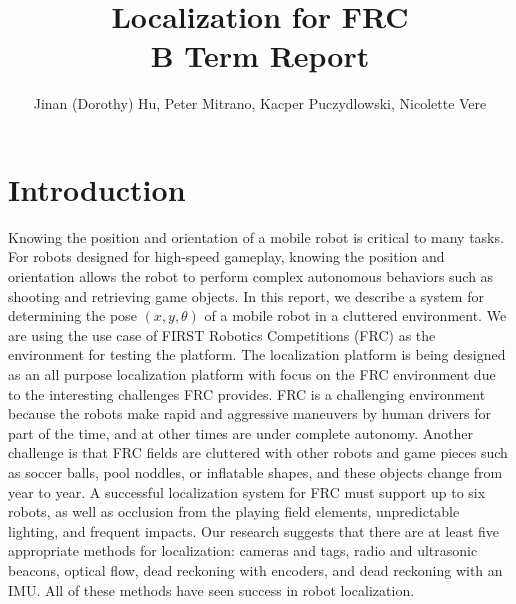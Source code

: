 \documentclass{article}
\begin{document}
\title{Localization for FRC \\
  \large{B Term Report}
  }
\author{Jinan (Dorothy) Hu, Peter Mitrano, Kacper Puczydlowski, Nicolette Vere}

\maketitle{}

\section{Introduction}

  Knowing the position and orientation of a mobile robot is critical to many tasks. For robots designed for high-speed gameplay, knowing the position and orientation allows the robot to perform complex autonomous behaviors such as shooting and retrieving game objects. In this report, we describe a system for determining the pose $(x, y, \theta)$ of a mobile robot in a cluttered environment. We are using the use case of FIRST Robotics Competitions (FRC) as the environment for testing the platform. The localization platform is being designed as an all purpose localization platform with focus on the FRC environment due to the interesting challenges FRC provides. FRC is a challenging environment because the robots make rapid and aggressive maneuvers by human drivers for part of the time, and at other times are under complete autonomy. Another challenge is that FRC fields are cluttered with other robots and game pieces such as soccer balls, pool noddles, or inflatable shapes, and these objects change from year to year. A successful localization system for FRC must support up to six robots, as well as occlusion from the playing field elements, unpredictable lighting, and frequent impacts. Our research suggests that there are at least five appropriate methods for localization: cameras and tags, radio and ultrasonic beacons, optical flow, dead reckoning with encoders, and dead reckoning with an IMU. All of these methods have seen success in robot localization.
\end{document}
